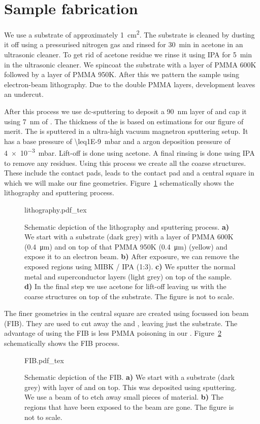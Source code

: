 \section{Sample fabrication}
\label{sec:method-sample-fabrication}
We use a  substrate of approximately \qty{1}{\square\centi\meter}. The substrate is cleaned by dusting it off using a pressurised nitrogen gas and rinsed for \qty{30}{\minute} in acetone in an ultrasonic cleaner. To get rid of acetone residue we rinse it using IPA for \qty{5}{\minute} in the ultrasonic cleaner. We spincoat the substrate with a layer of PMMA 600K followed by a layer of PMMA 950K. After this we pattern the sample using electron-beam lithography. Due to the double PMMA layers, development leaves an undercut.

After this process we use dc-sputtering to deposit a \qty{90}{\nano\meter} layer of  and cap it using \qty{7}{\nano\meter} of . The thickness of the  is based on estimations for our figure of merit. The  is sputtered in a ultra-high vacuum magnetron sputtering setup. It has a base pressure of \qty{\leq1E-9}{\milli\bar} and a argon deposition pressure of \qty{4e-3}{\milli\bar}. Lift-off is done using acetone. A final rinsing is done using IPA to remove any residues. Using this process we create all the coarse structures. These include the contact pads, leads to the contact pad and a central square in which we will make our fine geometries. Figure~\ref{fig:lithography} schematically shows the lithography and sputtering process.

\begin{figure}[ht!]
	\centering
	\def\svgwidth{\textwidth}
	{lithography.pdf_tex}
	\caption{Schematic depiction of the lithography and sputtering process. \textbf{a)} We start with a  substrate (dark grey) with a layer of PMMA 600K (\qty{0.4}{\micro\meter}) and on top of that PMMA 950K (\qty{0.4}{\micro\meter}) (yellow) and expose it to an electron beam. \textbf{b)} After exposure, we can remove the exposed regions using MIBK / IPA (1:3). \textbf{c)} We sputter the normal metal and superconductor layers (light grey) on top of the sample. \textbf{d)} In the final step we use acetone for lift-off leaving us with the coarse structures on top of the substrate. The figure is not to scale.}
	\label{fig:lithography}
\end{figure}

The finer geometries in the central square are created using focussed ion beam (FIB). They are used to cut away the  and , leaving just the substrate. The advantage of using the FIB is less PMMA poisoning in our . Figure~\ref{fig:FIB} schematically shows the FIB process.

\begin{figure}[ht!]
	\centering
	\def\svgwidth{0.5\textwidth}
	{FIB.pdf_tex}
	\caption{Schematic depiction of the FIB. \textbf{a)} We start with a  substrate (dark grey) with layer of  and  on top. This was deposited using sputtering. We use a beam of  to etch away small pieces of material. \textbf{b)} The regions that have been exposed to the  beam are gone. The figure is not to scale.}
	\label{fig:FIB}
\end{figure}